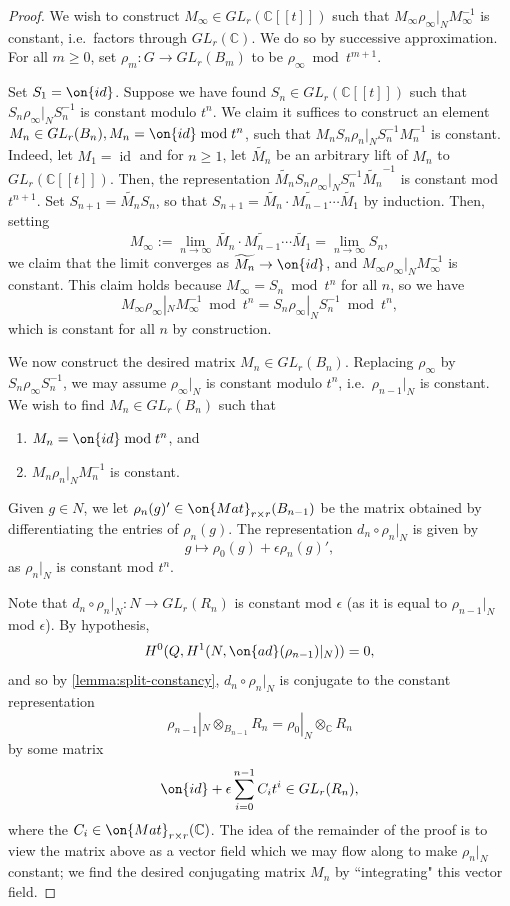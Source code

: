 \documentclass[12 pt]{amsart}
\theoremstyle{plain}
\theoremstyle{definition}
\theoremstyle{remark}
\numberwithin{equation}{section}
\DeclareMathOperator\id{id}
\begin{document}
\begin{proof}
We wish to construct $M_\infty\in GL_r(\mathbb{C}[[t]])$ such that $M_\infty\rho_\infty|_NM_\infty^{-1}$ is constant, i.e.~factors through $GL_r(\mathbb{C})$. We do so by successive approximation. For all $m\geq 0$, set $\rho_m: G\to GL_r(B_m)$ to be $\rho_\infty \bmod t^{m+1}$.

Set $S_1=\on{id}$. Suppose we have found $S_n\in GL_r(\mathbb{C}[[t]])$ such
that $S_n\rho_\infty|_N S_n^{-1}$ is constant modulo $t^n$.  We claim it
suffices to construct an element $M_n\in GL_r(B_n), M_n=\on{id}\bmod t^n$, such
that $M_nS_n\rho_n|_N S_n^{-1}M_n^{-1}$ is constant. Indeed, let
$M_1 = \id$ and for $n \geq 1$, let
$\widetilde{M_n}$ be an arbitrary lift of $M_n$ to $GL_r(\mathbb{C}[[t]])$. 
Then, the representation $\widetilde{M_n}S_n\rho_\infty|_NS_n^{-1}\widetilde{M_n}^{-1}$ is
constant mod $t^{n+1}$. Set $S_{n+1}=\widetilde{M_n}S_n$, so that $S_{n+1} =
\widetilde{M_n} \cdot \widetilde{M_{n-1}} \cdots \widetilde{M_1}$ by induction.
Then, setting $$M_\infty:=\lim_{n\to
\infty}\widetilde{M_n}\cdot\widetilde{M_{n-1}}\cdots
\widetilde{M_1}=\lim_{n\to\infty} S_n,$$ we claim that the limit converges as
$\widetilde{M_n}\to \on{id}$, and $M_\infty\rho_\infty|_N M_{\infty}^{-1}$ is
constant. This claim holds because $M_\infty=S_n\bmod t^n$ for all $n$, so we
have $$M_\infty \rho_\infty|_N M_\infty^{-1}\bmod t^n=S_n\rho_\infty|_N
S_n^{-1}\bmod t^n,$$ which is constant for all $n$ by construction. 

We now construct the desired matrix $M_n\in GL_r(B_n)$. Replacing $\rho_\infty$ by $S_n\rho_\infty S_n^{-1}$, we may assume $\rho_\infty|_N$ is constant modulo $t^n$, i.e.~$\rho_{n-1}|_N$ is constant. We wish to find $M_n\in GL_r(B_n)$ such that
\begin{enumerate}
\item $M_n=\on{id} \bmod t^n$, and
\item $M_n\rho_n|_NM_n^{-1}$ is constant.
\end{enumerate}

Given $g\in N$, we let $\rho_n(g)'\in \on{Mat}_{r\times r}(B_{n-1})$ be the matrix obtained by differentiating the entries of $\rho_n(g)$. The representation $d_n\circ \rho_n|_N$ is given by $$g\mapsto \rho_0(g)+\epsilon\rho_n(g)',$$ as $\rho_n|_N$ is constant mod $t^{n}$.

Note that $d_n\circ \rho_n|_N: N\to GL_r(R_n)$ is constant mod $\epsilon$ (as it is equal to $\rho_{n-1}|_N$ mod $\epsilon$). By hypothesis, $$H^0(Q, H^1(N, \on{ad}(\rho_{n-1})|_N))=0,$$ and so by \autoref{lemma:split-constancy}, $d_n\circ\rho_n|_N$ is conjugate to the constant representation $$\rho_{n-1}|_N\otimes_{B_{n-1}} R_n=\rho_0|_N\otimes_{\mathbb{C}} R_n$$ 
by some matrix $$\on{id}+\epsilon\sum_{i=0}^{n-1}C_it^i\in GL_r(R_n),$$ where
the $C_i\in \on{Mat}_{r\times r}(\mathbb{C})$. The idea of the remainder of the proof is to view the matrix above as a vector field which we may flow along to make $\rho_n|_N$ constant; we find the desired conjugating matrix $M_n$ by ``integrating" this vector field.


\end{proof}
\end{document}

